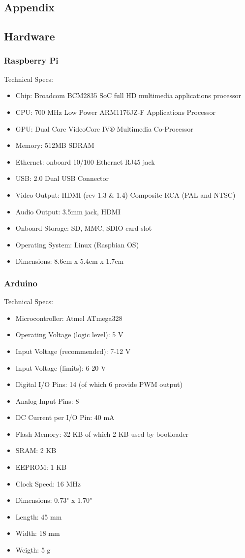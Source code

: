 \documentclass[12pt]{report}
\begin{document}
\newpage

\begin{appendices}
\chapter{Appendix}
\section{Hardware}
\subsection*{Raspberry Pi}

Technical Specs:
\begin{itemize}
\item Chip: Broadcom BCM2835 SoC full HD multimedia applications processor
\item CPU: 700 MHz Low Power ARM1176JZ-F Applications Processor
\item GPU: Dual Core VideoCore IV® Multimedia Co-Processor
\item Memory: 512MB SDRAM
\item Ethernet: onboard 10/100 Ethernet RJ45 jack
\item USB: 2.0 Dual USB Connector
\item Video Output: HDMI (rev 1.3 \& 1.4) Composite RCA (PAL and NTSC)
\item Audio Output: 3.5mm jack, HDMI
\item Onboard Storage: SD, MMC, SDIO card slot
\item Operating System: Linux (Raspbian OS)
\item Dimensions: 8.6cm x 5.4cm x 1.7cm
\end{itemize}

\subsection*{Arduino}

Technical Specs:
\begin{itemize}
\item Microcontroller: Atmel ATmega328
\item Operating Voltage (logic level): 5 V
\item Input Voltage (recommended): 7-12 V
\item Input Voltage (limits): 6-20 V
\item Digital I/O Pins: 14 (of which 6 provide PWM output)
\item Analog Input Pins: 8
\item DC Current per I/O Pin: 40 mA
\item Flash Memory:	32 KB of which 2 KB used by bootloader
\item SRAM: 2 KB 
\item EEPROM: 1 KB
\item Clock Speed: 16 MHz
\item Dimensions: 0.73" x 1.70"
\item Length: 45 mm
\item Width: 18 mm
\item Weigth: 5 g
\end{itemize}

\end{appendices}
\end{document}
